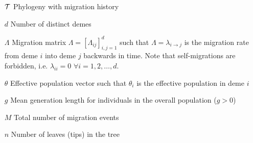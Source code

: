 \begin{itemize}
	\item[$\mathcal{T}$] Phylogeny with migration history
	\item[$d$] Number of distinct demes
	\item[$\Lambda$] Migration matrix $\Lambda = [\Lambda_{ij}]_{i,j=1}^d$ such that $\Lambda = \lambda_{i \rightarrow j}$ is the migration rate from deme $i$ into deme $j$ backwards in time. Note that self-migrations are forbidden, i.e. $\lambda_{ii} = 0$ $\forall i = 1,2, \dots, d$.
	\item[$\theta$] Effective population vector such that $\theta_i$ is the effective population in deme $i$
	\item[$g$] Mean generation length for individuals in the overall population ($g > 0$)
	\item[$M$] Total number of migration events
	\item[$n$] Number of leaves (tips) in the tree
\end{itemize}